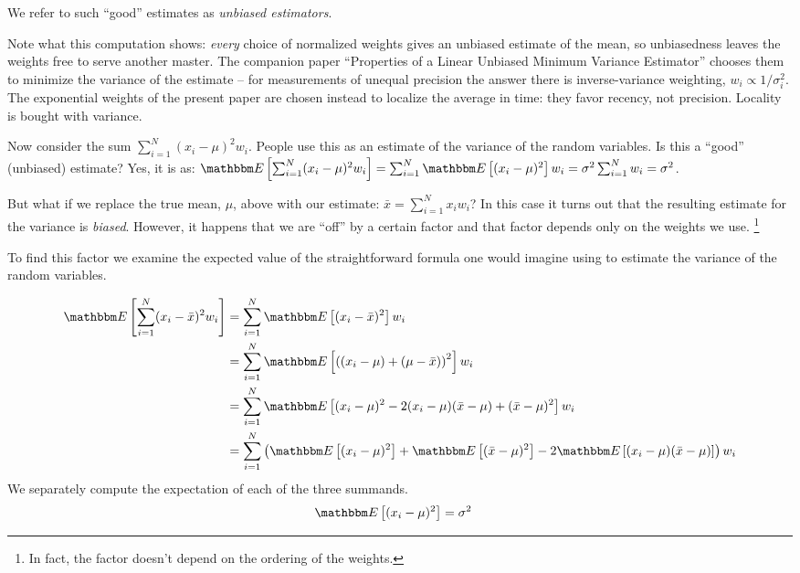 \documentclass{article}
\newcommand{\E}[1]{\mathbbm E\left[#1\right]}
\begin{document}
We refer to such ``good'' estimates as {\em unbiased estimators\/}.

Note what this computation shows: {\em every\/} choice of normalized
weights gives an unbiased estimate of the mean, so unbiasedness leaves
the weights free to serve another master. The companion paper
``Properties of a Linear Unbiased Minimum Variance Estimator'' chooses
them to minimize the variance of the estimate -- for measurements of
unequal precision the answer there is inverse-variance weighting,
$w_i \propto 1/\sigma_i^2$. The exponential weights of the present paper
are chosen instead to localize the average in time: they favor recency,
not precision. Locality is bought with variance.

Now consider the sum $\sum_{i=1}^N (x_i - \mu)^2 w_i$.
People use this as an estimate of the variance of the random variables. Is this a ``good'' (unbiased) estimate?
Yes, it is as: $\E{\sum_{i=1}^N (x_i - \mu)^2 w_i} = \sum_{i=1}^N \E{(x_i- \mu)^2} w_i = \sigma^2 \sum_{i=1}^N w_i = \sigma^2$.

But what if we replace the true mean, $\mu$, above with our estimate: ${\bar x} = \sum_{i=1}^N x_i w_i$?
In this case it turns out that the resulting estimate for the variance is {\em biased\/}.
However, it happens that we are ``off'' by a certain factor and that factor depends only on the weights 
we use.%
\footnote{In fact, the factor doesn't depend on the ordering of the weights.}

To find this factor we examine the expected value of the straightforward formula one would imagine
using to estimate the variance of the random variables.

\begin{align}
    \E{\sum_{i=1}^N (x_i - {\bar x})^2 w_i} &= \sum_{i=1}^N \E{(x_i - {\bar x})^2} w_i \\\nonumber
    &= \sum_{i=1}^N \E{\left((x_i - \mu) + (\mu - {\bar x})\right)^2} w_i \\\nonumber 
    &= \sum_{i=1}^N \E{(x_i - \mu)^2 - 2(x_i - \mu)({\bar x} - \mu ) + ({\bar x} - \mu)^2} w_i \\\nonumber 
    &= \sum_{i=1}^N \left( \E{(x_i - \mu)^2} + \E{({\bar x} - \mu)^2}
              - 2\E{(x_i - \mu) ({\bar x} - \mu) } \right) w_i \label{standard_emp_var}
\end{align}
We separately compute the expectation of each of the three summands.
\begin{align}
    \E{(x_i - \mu)^2} &= \sigma^2
\end{align}
\end{document}
